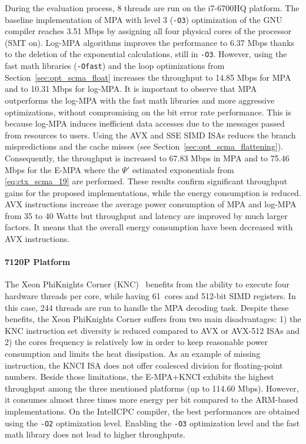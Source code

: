 During the evaluation process, 8 threads are run on the i7-6700HQ platform. The
baseline implementation of MPA with level 3 (\verb|-O3|) optimization of the GNU
compiler reaches 3.51 Mbps by assigning all four physical cores of the processor
(SMT on). Log-MPA algorithms improves the performance to 6.37 Mbps thanks to the
deletion  of the exponential calculations, still in \verb|-O3|. However, using
the fast math libraries (\verb|-Ofast|) and the loop optimizations from
Section~\ref{sec:opt_scma_float} increases the throughput to 14.85 Mbps for MPA
and to 10.31 Mbps for log-MPA. It is important to observe that MPA outperforms
the log-MPA with the fast math libraries and more aggressive optimizations,
without compromising on the bit error rate performance. This is because log-MPA
induces inefficient data accesses due to the messages passed from resources to
users. Using the AVX and SSE SIMD ISAs reduces the branch mispredictions and the
cache misses (see Section~\ref{sec:opt_scma_flattening}). Consequently, the
throughput is increased to 67.83 Mbps in MPA and to 75.46 Mbps for the E-MPA
where the $\Psi'$ estimated exponentials from \eqref{eq:ctx_scma_19} are
performed. These results confirm significant throughput gains for the proposed
implementations, while the energy consumption is reduced. AVX instructions
increase the average power consumption of MPA and log-MPA from 35 to 40 Watts
but throughput and latency are improved by much larger factors. It means that
the overall energy consumption have been decreased with AVX instructions.

\paragraph{7120P Platform}

The Xeon Phi\TM Knights Corner (KNC)~\cite{Chrysos2012} benefits from the
ability to execute four hardware threads per core, while having 61~cores and
512-bit SIMD registers. In this case, 244 threads are run to handle the MPA
decoding task. Despite these benefits, the Xeon Phi\TM Knights Corner suffers
from two main disadvantages: 1) the KNC instruction set diversity is reduced
compared to AVX or AVX-512 ISAs and 2) the cores frequency is relatively low in
order to keep reasonable power consumption and limits the heat dissipation. As
an example of missing instruction, the KNCI ISA does not offer coalesced
division for floating-point numbers. Beside those limitations, the E-MPA+KNCI
exhibits the highest throughput among the three mentioned platforms (up to
114.60 Mbps). However, it consumes almost three times more energy per bit
compared to the ARM\R-based implementations. On the Intel\R ICPC compiler, the
best performances are obtained using the \verb|-O2| optimization level. Enabling
the \verb|-O3| optimization level and the fast math library does not lead to
higher throughputs.

